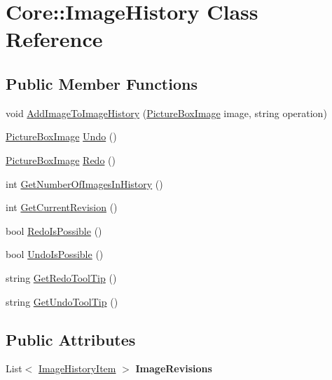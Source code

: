 \hypertarget{class_core_1_1_image_history}{
\section{Core::ImageHistory Class Reference}
\label{class_core_1_1_image_history}
}
\subsection*{Public Member Functions}
\begin{DoxyCompactItemize}
\item 
void \hyperlink{class_core_1_1_image_history_ae78f2ce36eb77fb936d1a778e8d9a399}{AddImageToImageHistory} (\hyperlink{class_core_1_1_images_1_1_picture_box_image}{PictureBoxImage} image, string operation)
\item 
\hyperlink{class_core_1_1_images_1_1_picture_box_image}{PictureBoxImage} \hyperlink{class_core_1_1_image_history_a61c5c700c73a60c3c4bec95d530f6379}{Undo} ()
\item 
\hyperlink{class_core_1_1_images_1_1_picture_box_image}{PictureBoxImage} \hyperlink{class_core_1_1_image_history_abb49be956c8ba3a17e054078a09d1018}{Redo} ()
\item 
int \hyperlink{class_core_1_1_image_history_ae26bcfeed34a733dd372896a86bbc3d4}{GetNumberOfImagesInHistory} ()
\item 
int \hyperlink{class_core_1_1_image_history_a421e672ff9f20e10a03bf989cff4442e}{GetCurrentRevision} ()
\item 
bool \hyperlink{class_core_1_1_image_history_adefaa91513a3548c5a85d0b3247b7063}{RedoIsPossible} ()
\item 
bool \hyperlink{class_core_1_1_image_history_a45908055c40dd586e4f426b7eab3ee3e}{UndoIsPossible} ()
\item 
string \hyperlink{class_core_1_1_image_history_a2c9d2a7856c91909f83f3cb8ddf0bf25}{GetRedoToolTip} ()
\item 
string \hyperlink{class_core_1_1_image_history_af8a4f906b430aaaa9ec350ba4bc8d416}{GetUndoToolTip} ()
\end{DoxyCompactItemize}
\subsection*{Public Attributes}
\begin{DoxyCompactItemize}
\item 
\hypertarget{class_core_1_1_image_history_abb81d12e0bcf3f1f0e79c797f38cc6f2}{
List$<$ \hyperlink{class_core_1_1_image_history_item}{ImageHistoryItem} $>$ {\bfseries ImageRevisions}}
\label{class_core_1_1_image_history_abb81d12e0bcf3f1f0e79c797f38cc6f2}

\end{DoxyCompactItemize}
